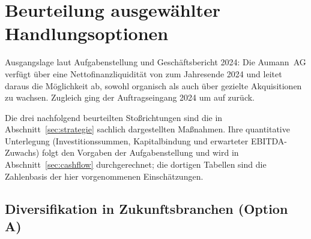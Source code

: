\section{Beurteilung ausgew\"ahlter Handlungsoptionen}
\label{sec:optionen}

Ausgangslage laut Aufgabenstellung und Gesch\"aftsbericht 2024: Die Aumann~AG
verf\"ugt \"uber eine Nettofinanzliquidit\"at von \MioEUR{\NettoliquiditaetZFIV}
zum Jahresende 2024 und leitet daraus die M\"oglichkeit ab,
sowohl organisch als auch \"uber gezielte Akquisitionen zu wachsen. Zugleich
ging der Auftragseingang 2024 um \PctBetrag{\AuftragseingangDeltaZFIV} auf
\MioEUR{\AuftragseingangZFIV} zur\"uck.

Die drei nachfolgend beurteilten Sto{\ss}richtungen sind die in
Abschnitt~\ref{sec:strategie} sachlich dargestellten Ma{\ss}nahmen. Ihre
quantitative Unterlegung (Investitionssummen, Kapitalbindung und erwarteter
EBITDA-Zuwachs) folgt den Vorgaben der Aufgabenstellung und wird in
Abschnitt~\ref{sec:cashflow} durchgerechnet; die dortigen Tabellen sind die
Zahlenbasis der hier vorgenommenen Einsch\"atzungen.

\subsection{Diversifikation in Zukunftsbranchen (Option A)}
\label{subsec:option-a}

